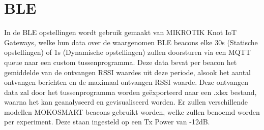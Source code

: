 \section{BLE}
\label{sec:met-ble}
In de BLE opstellingen wordt gebruik gemaakt van MIKROTIK Knot IoT Gateways, welke hun data over de waargenomen BLE beacons elke 30s (Statische opstellingen) of 1s (Dynamische opstellingen) zullen doorsturen via een MQTT queue naar een custom tussenprogramma. Deze data bevat per beacon het gemiddelde van de ontvangen RSSI waardes uit deze periode, alsook het aantal ontvangen berichten en de maximaal ontvangen RSSI waarde. Deze ontvangen data zal door het tussenprogramma worden geëxporteerd naar een .xlsx bestand, waarna het kan geanalyseerd en gevisualiseerd worden. Er zullen verschillende modellen MOKOSMART beacons gebruikt worden, welke zullen benoemd worden per experiment. Deze staan ingesteld op een Tx Power van -12dB.





